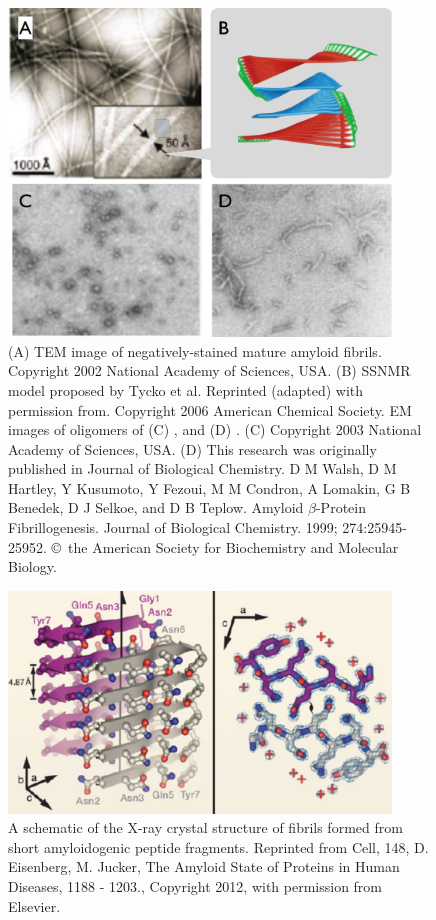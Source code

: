 \begin{figure}
 \centering
 \includegraphics[width=4in]{figures/introduction/fibril_TEM_SSNMR.pdf}
 \caption[EM images of amyloid fibrils and oligomers]{(A) TEM image of negatively-stained mature amyloid fibrils.\cite{Petkova:2002p305} Copyright 2002 National Academy of Sciences, USA.  (B) SSNMR model proposed by Tycko et al. Reprinted (adapted) with permission from\cite{Petkova:2006gx}. Copyright 2006 American Chemical Society. EM images of oligomers of (C) ,\cite{Bitan:2003ut} and (D) .  (C) Copyright 2003 National Academy of Sciences, USA. (D) This research was originally published in Journal of Biological Chemistry. D M Walsh, D M Hartley, Y Kusumoto, Y Fezoui, M M Condron, A Lomakin, G B Benedek, D J Selkoe, and D B Teplow. Amyloid $\beta$-Protein Fibrillogenesis. Journal of Biological Chemistry. 1999; 274:25945-25952. \copyright\ the American Society for Biochemistry and Molecular Biology.}
 \label{fig:fibril_TEM_SSNMR}
\end{figure}

\begin{figure}
 \centering
 \includegraphics[width=4in]{figures/introduction/fibril_xray_model.pdf}
 \caption[X-ray crystal structure of an amyloid fibril]{A schematic of the X-ray crystal structure of fibrils formed from short amyloidogenic peptide fragments. Reprinted from Cell, 148, D. Eisenberg, M. Jucker, The Amyloid State of Proteins in Human Diseases, 1188 - 1203.,  Copyright 2012, with permission from Elsevier.}
 \label{fig:fibril_xray_model}
\end{figure}

